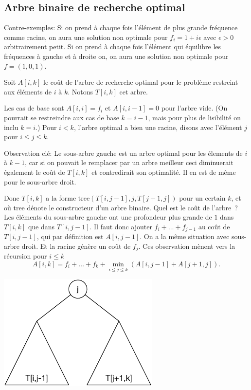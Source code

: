 \documentclass[12pt]{article}
\begin{document}
\subsection{Arbre binaire de recherche optimal}

Contre-exemples: Si on prend à chaque fois l'élément de plus grande fréquence
comme racine, on aura une solution non optimale pour $f_i=1+i \epsilon$ avec
$\epsilon >0$ arbitrairement petit. Si on prend à chaque fois l'élément qui
équilibre les fréquences à gauche et à droite on, on aura une solution non
optimale pour $f=(1,0,1)$.


Soit $A[i,k]$ le coût de l'arbre de recherche optimal pour le problème
restreint aux éléments de $i$ à $k$. Notons $T[i,k]$ cet arbre.

  Les cas de base sont $A[i,i]=f_i$ et $A[i,i-1]=0$ pour l'arbre vide. (On pourrait se restreindre aux cas de base $k=i-1$, mais pour plus de lisibilité on inclu $k=i$.) 
Pour $i<k$, l'arbre optimal a bien une racine, disons avec l'élément $j$ pour $i\leq j\leq k$.  

Observation clé: Le sous-arbre gauche est un arbre optimal pour les élements de $i$ à $k-1$, car si on pouvait le remplacer par un arbre meilleur ceci diminuerait également le coût de $T[i,k]$ et contredirait son optimalité.  Il en est de même pour le sous-arbre droit.

Donc $T[i,k]$ a la forme $\textrm{tree}(T[i,j-1],j,T[j+1,j])$ pour un certain $k$, et où tree dénote le constructeur d'un arbre binaire. Quel est le coût de l'arbre~?
Les éléments du sous-arbre gauche ont une profondeur plus grande de $1$ dans $T[i,k]$ que dans $T[i,j-1]$. Il faut donc ajouter $f_i + \ldots +f_{j-1}$ au coût de $T[i,j-1]$, qui par définition est $A[i,j-1]$.  On a la même situation avec sous-arbre droit. Et la racine génère un coût de $f_j$.  Ces observation mènent vers la récursion pour $i \leq k$
\[
	A[i,k] = f_i + \ldots + f_k +  \min_{i\leq j\leq k} (A[i,j-1] + A[j+1,j]).
\]


     \centerline{\includegraphics{arbre_bin_rech_opt.pdf}}
\end{document}
